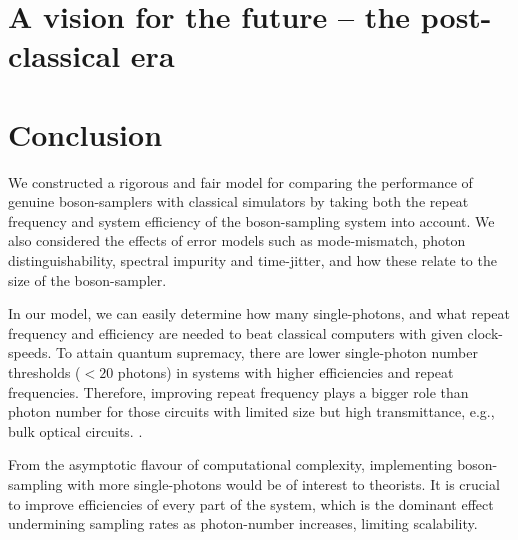 \documentclass[aps,rmp,twocolumn,amsmath,amssymb,nofootinbib,superscriptaddress]{revtex4}
\newcommand{\comment}[1]{{\color{blue}{#1}}}
\begin{document}
\section{A vision for the future -- the post-classical era}

\comment{Be more bold, ambitious and futuristic. Don't just want to match and slightly improve on classical computers. We want to massively outperform the world's biggest supercomputers by orders of magnitude. Let's talk more about that regime, instead of the regime where n=4 outperforms a desktop PC. That's a really uninspiring regime to talk about. How much will technology have to improve to get us to that more ambitious level? Let's look at a Moore's Law projection and estimate where classical supercomputing is going. Then let's make a boson-sampler that's faster than the biggest supercomputer 20 years from now. Then we can actually make a claim to have entered the post-classical era!}

\section{Conclusion} \label{sec:conclusion}

We constructed a rigorous and fair model for comparing the performance of genuine boson-samplers with classical simulators by taking both the repeat frequency and system efficiency of the boson-sampling system into account. We also considered the effects of error models such as mode-mismatch, photon distinguishability, spectral impurity and time-jitter, and how these relate to the size of the boson-sampler.

In our model, we can easily determine how many single-photons, and what repeat frequency and efficiency are needed to beat classical computers with given clock-speeds. To attain quantum supremacy, there are lower single-photon number thresholds ($<20$ photons) in systems with higher efficiencies and repeat frequencies. Therefore, improving repeat frequency plays a bigger role than photon number for those circuits with limited size but high transmittance, e.g., bulk optical circuits. \comment{Don't quite understand this last sentence}.

From the asymptotic flavour of computational complexity, implementing boson-sampling with more single-photons would be of interest to theorists. It is crucial to improve efficiencies of every part of the system, which is the dominant effect undermining sampling rates as photon-number increases, limiting scalability.
\end{document}
